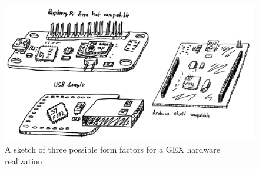 \begin{figure}[h]
	\centering
	\includegraphics[width=\textwidth] {img/gex-ff-sketches.png}
	\caption[Form factor sketches]{\label{fig:ff_sketches}A sketch of three possible form factors for a GEX hardware realization}
\end{figure}









